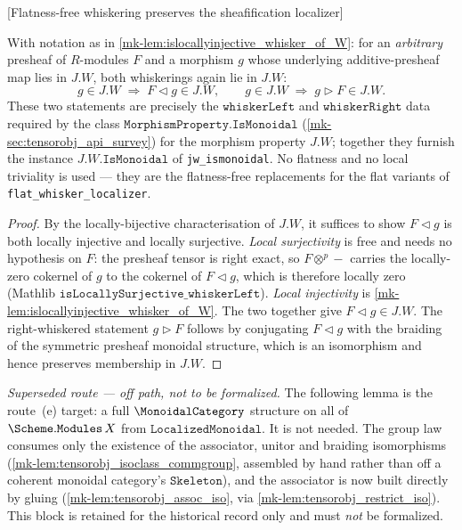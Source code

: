 \begin{lemma}

[Flatness-free whiskering preserves the sheafification localizer]
  \label{mk-lem:whisker_of_W}
  \leanok

  With notation as in \ref{mk-lem:islocallyinjective_whisker_of_W}: for an
  \emph{arbitrary} presheaf of \(R\)-modules \(F\) and a morphism \(g\) whose
  underlying additive-presheaf map lies in \(J.W\), both whiskerings again lie in
  \(J.W\):
  \[
    g \in J.W \;\Longrightarrow\; F \triangleleft g \in J.W,
    \qquad
    g \in J.W \;\Longrightarrow\; g \triangleright F \in J.W .
  \]
  These two statements are precisely the \(\mathtt{whiskerLeft}\) and
  \(\mathtt{whiskerRight}\) data required by the class
  \(\mathtt{MorphismProperty.IsMonoidal}\) (\ref{mk-sec:tensorobj_api_survey}) for
  the morphism property \(J.W\); together they furnish the instance
  \(J.W.\mathtt{IsMonoidal}\) of \texttt{jw\_ismonoidal}. No flatness and no
  local triviality is used --- they are the flatness-free replacements for the
  flat variants of \texttt{flat\_whisker\_localizer}.
\end{lemma}

\begin{proof}
  \leanok
  By the locally-bijective characterisation of \(J.W\), it suffices to show
  \(F \triangleleft g\) is both locally injective and locally surjective.
  \emph{Local surjectivity} is free and needs no hypothesis on \(F\): the presheaf
  tensor is right exact, so \(F \otimes^{p} -\) carries the locally-zero cokernel
  of \(g\) to the cokernel of \(F \triangleleft g\), which is therefore locally
  zero (Mathlib \(\mathtt{isLocallySurjective\_whiskerLeft}\)). \emph{Local
  injectivity} is \ref{mk-lem:islocallyinjective_whisker_of_W}. The two together
  give \(F \triangleleft g \in J.W\). The right-whiskered statement
  \(g \triangleright F\) follows by conjugating \(F \triangleleft g\) with the
  braiding of the symmetric presheaf monoidal structure, which is an isomorphism
  and hence preserves membership in \(J.W\).
\end{proof}

\emph{Superseded route --- off path, not to be formalized.} The following lemma is
the route~(e) target: a full \(\MonoidalCategory\) structure on all of
\(\Scheme.\mathtt{Modules}\,X\) from \(\mathtt{LocalizedMonoidal}\). It is not
needed. The group law consumes only the existence of the associator, unitor and
braiding isomorphisms (\ref{mk-lem:tensorobj_isoclass_commgroup}, assembled by hand
rather than off a coherent monoidal category's \(\mathtt{Skeleton}\)), and the
associator is now built directly by
gluing (\ref{mk-lem:tensorobj_assoc_iso}, via \ref{mk-lem:tensorobj_restrict_iso}). This
block is retained for the historical record only and must \emph{not} be formalized.

